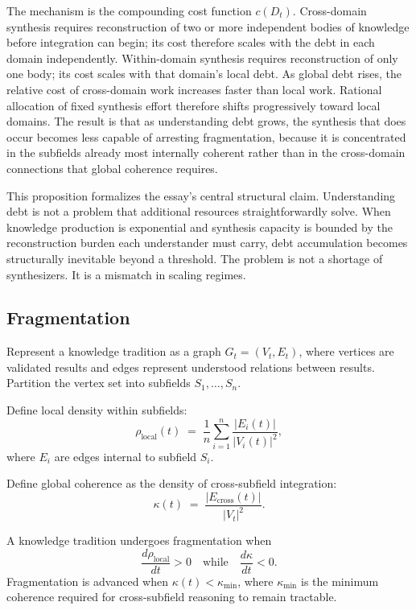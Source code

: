 The mechanism is the compounding cost function $c(D_t)$. Cross-domain
synthesis requires reconstruction of two or more independent bodies of
knowledge before integration can begin; its cost therefore scales with the
debt in each domain independently. Within-domain synthesis requires
reconstruction of only one body; its cost scales with that domain's local
debt. As global debt rises, the relative cost of cross-domain work increases
faster than local work. Rational allocation of fixed synthesis effort therefore
shifts progressively toward local domains. The result is that as understanding
debt grows, the synthesis that does occur becomes less capable of arresting
fragmentation, because it is concentrated in the subfields already most
internally coherent rather than in the cross-domain connections that global
coherence requires.

This proposition formalizes the essay's central structural claim. Understanding
debt is not a problem that additional resources straightforwardly solve. When
knowledge production is exponential and synthesis capacity is bounded by
the reconstruction burden each understander must carry, debt accumulation
becomes structurally inevitable beyond a threshold. The problem is not a
shortage of synthesizers. It is a mismatch in scaling regimes.

\subsection*{Fragmentation}

Represent a knowledge tradition as a graph $G_t = (V_t, E_t)$, where vertices
are validated results and edges represent understood relations between results.
Partition the vertex set into subfields $S_1, \ldots, S_n$.

Define local density within subfields:
\[
\rho_{\mathrm{local}}(t)
\;=\;
\frac{1}{n}\sum_{i=1}^n \frac{|E_i(t)|}{|V_i(t)|^2},
\]
where $E_i$ are edges internal to subfield $S_i$.

Define global coherence as the density of cross-subfield integration:
\[
\kappa(t)
\;=\;
\frac{|E_{\mathrm{cross}}(t)|}{|V_t|^2}.
\]

\begin{defn}[Fragmentation]
A knowledge tradition undergoes fragmentation when
\[
\frac{d\rho_{\mathrm{local}}}{dt} > 0
\quad \text{while} \quad
\frac{d\kappa}{dt} < 0.
\]
Fragmentation is advanced when $\kappa(t) < \kappa_{\min}$, where $\kappa_{\min}$
is the minimum coherence required for cross-subfield reasoning to remain
tractable.
\end{defn}


